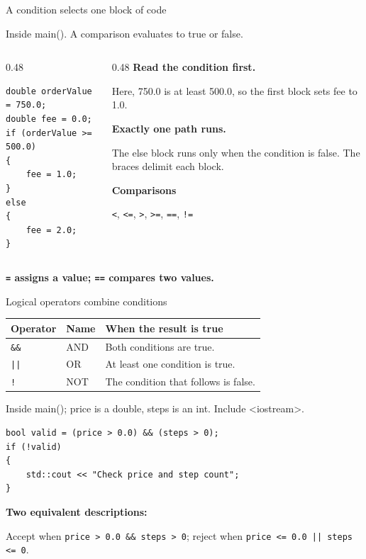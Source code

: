\documentclass[10pt,aspectratio=169]{beamer}
\newcommand{\intro}[1]{{\small #1\par}}
\begin{document}
\begin{frame}[fragile]{A condition selects one block of code}
\relax
\intro{Inside main(). A comparison evaluates to true or false.}
\begin{columns}[T,onlytextwidth]
\begin{column}{0.48\textwidth}
\begin{lstlisting}
double orderValue = 750.0;
double fee = 0.0;
if (orderValue >= 500.0)
{
    fee = 1.0;
}
else
{
    fee = 2.0;
}
\end{lstlisting}
\end{column}
\begin{column}{0.48\textwidth}
\textbf{Read the condition first.}\par
Here, 750.0 is at least 500.0, so the first block sets fee to 1.0.
\medskip\par
\textbf{Exactly one path runs.}\par
The else block runs only when the condition is false. The braces delimit each block.
\medskip\par
\textbf{Comparisons}\par
\texttt{<}, \texttt{<=}, \texttt{>}, \texttt{>=}, \texttt{==}, \texttt{!=}
\end{column}
\end{columns}
\smallskip
\textbf{\texttt{=} assigns a value; \texttt{==} compares two values.}
\end{frame}

\begin{frame}[fragile]{Logical operators combine conditions}
\relax
\renewcommand{\arraystretch}{1.25}
\begin{tabularx}{\textwidth}{@{}l l X@{}}
\toprule
\textbf{Operator} & \textbf{Name} & \textbf{When the result is true} \\
\midrule
\texttt{\&\&} & AND & Both conditions are true. \\
\texttt{||} & OR & At least one condition is true. \\
\texttt{!} & NOT & The condition that follows is false. \\
\bottomrule
\end{tabularx}\par
\medskip
\intro{Inside main(); price is a double, steps is an int. Include <iostream>.}
\begin{lstlisting}
bool valid = (price > 0.0) && (steps > 0);
if (!valid)
{
    std::cout << "Check price and step count";
}
\end{lstlisting}
\textbf{Two equivalent descriptions:}\par
Accept when \texttt{price > 0.0 \&\& steps > 0}; reject when \texttt{price <= 0.0 || steps <= 0}.
\end{frame}
\end{document}
